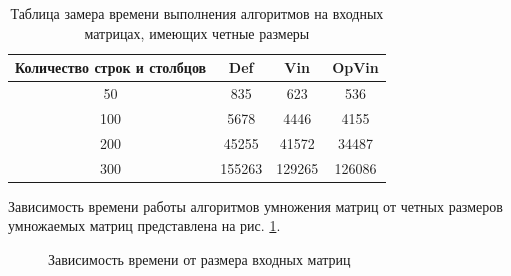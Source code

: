 \documentclass[12pt]{report}
\begin{document}
	\begin{table} [H]
		\caption{Таблица замера времени выполнения алгоритмов на входных матрицах, имеющих четные размеры}
		\label{table:t1}
		\begin{center}
			\begin{tabular}{|c | c | c | c |}
				
				\hline
				
				Количество строк и столбцов & Def & Vin & OpVin \\ [0.5ex]
				
				\hline
				
				50 & 835 & 623 & 536 \\ 
				
				\hline 
				
				100 & 5678 & 4446 & 4155\\ 
				
				\hline 
				
				200 & 45255 & 41572 & 34487\\ 
				
				\hline 
				
				300 & 155263 & 129265 & 126086\\ 
				
				\hline 
			\end{tabular}
		\end{center}
	\end{table}

	Зависимость времени работы алгоритмов умножения матриц от четных размеров умножаемых матриц представлена на рис. \ref{ris1}.

	\begin{center}
		\begin{figure}[H]
		\center
		\caption{Зависимость времени от размера входных матриц}
		\label{ris1}
		\end{figure}
	\end{center}
	
\end{document}
